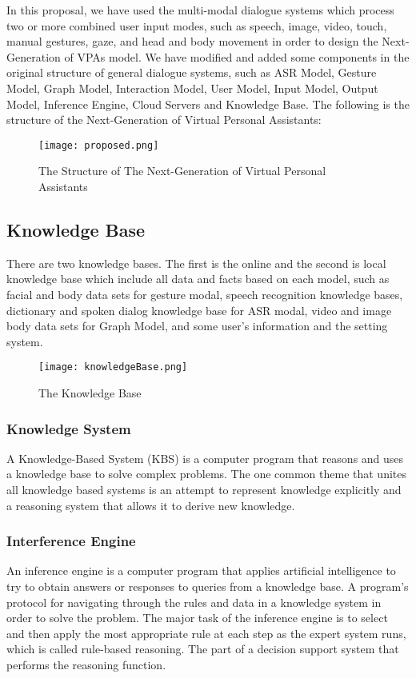 \documentclass[12pt,a4paper]{article}
\begin{document}
In this proposal, we have used the multi-modal dialogue
systems which process two or more combined user input
modes, such as speech, image, video, touch, manual gestures,
gaze, and head and body movement in order to design the
Next-Generation of VPAs model. We have modified and added
some components in the original structure of general dialogue
systems, such as ASR Model, Gesture Model, Graph Model,
Interaction Model, User Model, Input Model, Output Model,
Inference Engine, Cloud Servers and Knowledge Base. The
following is the structure of the Next-Generation of Virtual
Personal Assistants:


\begin{figure}[h]
	\centering
	\texttt{[image: proposed.png]}
	\caption{The Structure of The Next-Generation of Virtual Personal Assistants}
\end{figure}

\newpage
\subsection{Knowledge Base}
\par There are two knowledge bases. The first is the online and
the second is local knowledge base which include all data and
facts based on each model, such as facial and body data sets for
gesture modal, speech recognition knowledge bases, dictionary
and spoken dialog knowledge base for ASR modal, video and
image body data sets for Graph Model, and some user’s
information and the setting system.

\par 

\begin{figure}[h]
	\centering
	\texttt{[image: knowledgeBase.png]}
	\caption{The Knowledge Base}
\end{figure}

\subsubsection{Knowledge System}
\par A Knowledge-Based System (KBS) is a computer program that
reasons and uses a knowledge base to solve complex problems. The one common theme that unites all knowledge based
systems is an attempt to represent knowledge explicitly and a
reasoning system that allows it to derive new knowledge.

\subsubsection{Interference Engine}
\par  An inference engine is a computer program that applies artificial intelligence to try to obtain answers or responses to queries from a knowledge base. A program’s protocol for navigating through the rules and data in a knowledge system in order to solve the problem. The major task of the inference engine is to select and then apply the most appropriate rule at each step as the expert system runs, which is called rule-based reasoning. The part of a decision support system that performs the reasoning function.
\end{document}
